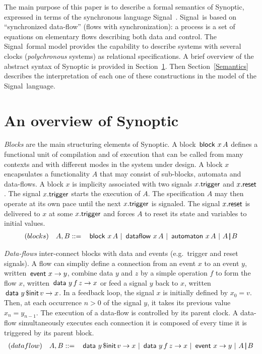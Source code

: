 \documentclass[copyright,creativecommons]{eptcs}
\newcommand{\signal}{{\sc Signal}}
\newcommand{\op}[1]{{\sf #1}}
\newcommand{\kw}[1]{{{\,\op{#1}\,}}}
\newcommand{\Pre}{\kw{\$ init}}
\newcommand{\Par}{{\,|\!\!|\,}}
\newcommand{\ra}{\rightarrow}
\renewcommand{\:}{{:}}
\newcommand{\Data}{{\kw{data}}}
\newcommand{\Dataflow}{{\kw{dataflow}}}
\newcommand{\Event}{{\kw{event}}}
\newcommand{\trigger}{{\op{trigger}}}
\newcommand{\reset}{{\op{reset}}}
\newcommand{\block}{{\kw{block}}}
\newcommand{\Auto}{{\kw{automaton}}}
\begin{document}
The main purpose of this paper is to describe a formal semantics of Synoptic, expressed in terms of the synchronous language \signal\ \cite{Signal,Polychrony}. \signal\ is based on ``synchronized data-flow'' (flows with synchronization): a process is a set of equations on elementary flows describing both data and control. The \signal\ formal model provides the capability to describe systems with several clocks ({\em polychronous} systems) as relational specifications. A brief overview of the abstract syntax of Synoptic is provided in Section~\ref{Syntax}. Then Section~\ref{Semantics} describes the interpretation of each one of these constructions in the model of the \signal\ language.


\section{An overview of Synoptic}
\label{Syntax}

{\em Blocks} are the main structuring elements of Synoptic. A block $\block\,x\,A$ defines a functional unit of compilation and of execution that can be called from many contexts and with different modes in the system under design. A block $x$ encapsulates a functionality $A$ that may consist of sub-blocks, automata and data-flows.  A block $x$ is implicity associated with two signals $x.\trigger$ and $x.\reset$.  The signal $x.\trigger$ starts the execution of $A$.  The specification $A$ may then operate at its own pace until the next $x.\trigger$ is signaled.   The signal $x.\reset$ is delivered to $x$ at some $x.\trigger$ and forces $A$ to reset its state and variables to initial values.
\[
\begin{array}{rl}
(blocks)\quad A,B::= &\block\,x\,A\ |\ \Dataflow\,x\,A\ |\ \Auto\,x\, A\ |\ A\Par B
\end{array}
\]

{\em Data-flows} inter-connect blocks with data and events (e.g.\ trigger and reset signals). A flow can simpliy define a connection from an event $x$ to an event $y$, written $\Event\,x\ra y$, combine data $y$ and $z$ by a simple operation $f$ to form the flow $x$, written $\Data\,y\,f\,z\ra x$ or   feed a signal $y$ back to $x$, written $\Data\,y\Pre v\ra x$.  In a feedback loop, the signal $x$ is initially defined by $x_0=v$. Then, at each occurrence $n>0$ of the signal $y$, it takes its previous value $x_n=y_{n-1}$. The execution of a data-flow is controlled by its parent clock.  A data-flow simultaneously executes each connection it is composed of every time it is triggered by its parent block.
\[
\begin{array}{rl}
(dataflow)\quad A,B::= &\Data\,y\Pre v\ra x\ |\ \Data\,y\,f\,z\ra x\ |\ \Event\,x\ra y\ |\ A\Par B
\end{array}
\]
\end{document}
